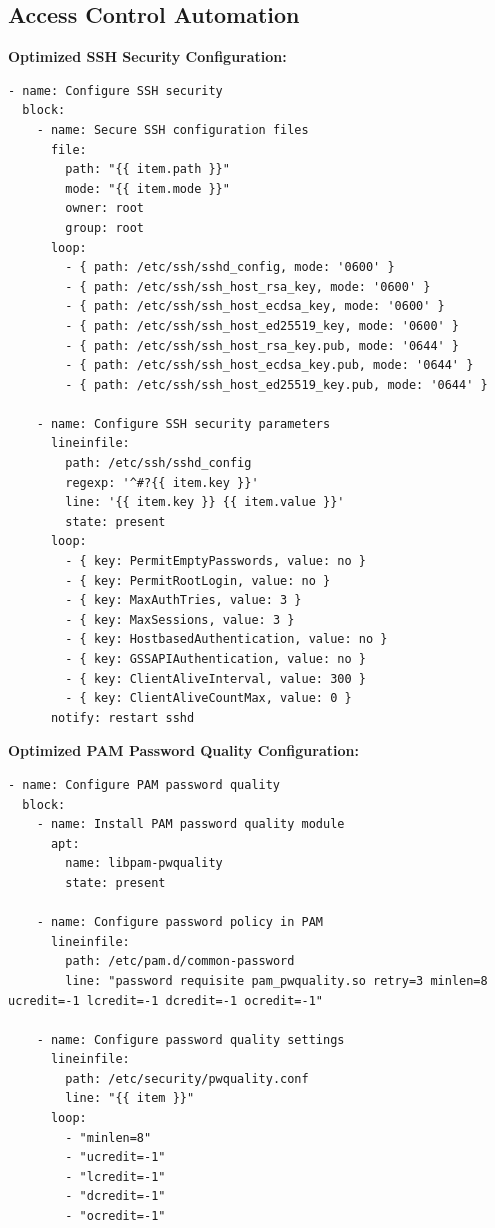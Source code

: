 \subsection{Access Control Automation}

\noindent \textbf{Optimized SSH Security Configuration:}
\begin{verbatim}
- name: Configure SSH security
  block:
    - name: Secure SSH configuration files
      file:
        path: "{{ item.path }}"
        mode: "{{ item.mode }}"
        owner: root
        group: root
      loop:
        - { path: /etc/ssh/sshd_config, mode: '0600' }
        - { path: /etc/ssh/ssh_host_rsa_key, mode: '0600' }
        - { path: /etc/ssh/ssh_host_ecdsa_key, mode: '0600' }
        - { path: /etc/ssh/ssh_host_ed25519_key, mode: '0600' }
        - { path: /etc/ssh/ssh_host_rsa_key.pub, mode: '0644' }
        - { path: /etc/ssh/ssh_host_ecdsa_key.pub, mode: '0644' }
        - { path: /etc/ssh/ssh_host_ed25519_key.pub, mode: '0644' }

    - name: Configure SSH security parameters
      lineinfile:
        path: /etc/ssh/sshd_config
        regexp: '^#?{{ item.key }}'
        line: '{{ item.key }} {{ item.value }}'
        state: present
      loop:
        - { key: PermitEmptyPasswords, value: no }
        - { key: PermitRootLogin, value: no }
        - { key: MaxAuthTries, value: 3 }
        - { key: MaxSessions, value: 3 }
        - { key: HostbasedAuthentication, value: no }
        - { key: GSSAPIAuthentication, value: no }
        - { key: ClientAliveInterval, value: 300 }
        - { key: ClientAliveCountMax, value: 0 }
      notify: restart sshd
\end{verbatim}

\noindent \textbf{Optimized PAM Password Quality Configuration:}
\begin{verbatim}
- name: Configure PAM password quality
  block:
    - name: Install PAM password quality module
      apt:
        name: libpam-pwquality
        state: present

    - name: Configure password policy in PAM
      lineinfile:
        path: /etc/pam.d/common-password
        line: "password requisite pam_pwquality.so retry=3 minlen=8 ucredit=-1 lcredit=-1 dcredit=-1 ocredit=-1"

    - name: Configure password quality settings
      lineinfile:
        path: /etc/security/pwquality.conf
        line: "{{ item }}"
      loop:
        - "minlen=8"
        - "ucredit=-1"
        - "lcredit=-1"
        - "dcredit=-1"
        - "ocredit=-1"
\end{verbatim}

